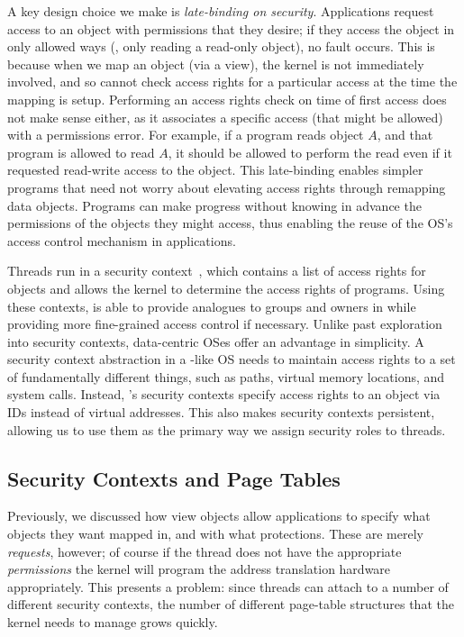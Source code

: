 A key design choice we make is \emph{late-binding on security}. Applications
request access to an object with permissions that they desire;
if they access the object in only allowed ways (\eg, only reading a read-only
object), no fault occurs.
This is because when we map an object (via a view), the kernel is not immediately involved, and so
cannot check access rights for a particular access at the time the mapping is setup. Performing an access rights check on
time of first access does not make sense either, as it associates a specific access (that
might be allowed) with a permissions error. For example, if a program reads object $A$, and that program is
allowed to read $A$, it should be allowed to perform the read even if it requested read-write access
to the object.
This late-binding enables simpler programs that need not worry about
elevating access rights through remapping data objects. Programs can make progress without
knowing in advance the permissions of the objects they might access, thus enabling the reuse of the
OS's access control mechanism in applications.

Threads run in a security context~\cite{lwc,bittau:nsdi08,elhajj:asplos16}, which
contains a list of access rights for objects and allows the kernel to determine the access rights of
programs. Using these contexts, \Twizzler is able to provide
analogues to groups and owners in \unix while providing more fine-grained access control if
necessary. Unlike past exploration into security contexts, data-centric OSes offer an
advantage in simplicity. A security context abstraction in a \unix-like OS needs to
maintain access rights to a set of fundamentally different things, such as paths, virtual memory
locations, and system calls. Instead, \Twizzler's security contexts specify access rights to an object
via IDs instead of virtual addresses.
This also makes security contexts persistent, allowing us to use them as
the primary way we assign security roles to threads.


\subsection{Security Contexts and Page Tables}
\label{sec:secimpl}
Previously, we discussed how view objects allow applications to specify what objects they
want mapped in, and with what protections. These are merely \emph{requests}, however; of course if
the thread does not have the appropriate \emph{permissions} the kernel will program the address
translation hardware appropriately. This presents a problem: since threads can attach to a number of
different security contexts, the number of different page-table structures that the kernel needs to
manage grows quickly.

